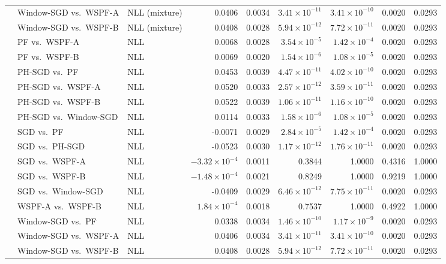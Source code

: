 {\begin{longtable}{@{}lllrrrrrr@{}}
 & Window-SGD vs.\ WSPF-A & NLL (mixture) & 0.0406 & 0.0034 & $3.41\times 10^{-11}$ & $3.41\times 10^{-10}$ & 0.0020 & 0.0293 \\
 & Window-SGD vs.\ WSPF-B & NLL (mixture) & 0.0408 & 0.0028 & $5.94\times 10^{-12}$ & $7.72\times 10^{-11}$ & 0.0020 & 0.0293 \\
 & PF vs.\ WSPF-A & NLL & 0.0068 & 0.0028 & $3.54\times 10^{-5}$ & $1.42\times 10^{-4}$ & 0.0020 & 0.0293 \\
 & PF vs.\ WSPF-B & NLL & 0.0069 & 0.0020 & $1.54\times 10^{-6}$ & $1.08\times 10^{-5}$ & 0.0020 & 0.0293 \\
 & PH-SGD vs.\ PF & NLL & 0.0453 & 0.0039 & $4.47\times 10^{-11}$ & $4.02\times 10^{-10}$ & 0.0020 & 0.0293 \\
 & PH-SGD vs.\ WSPF-A & NLL & 0.0520 & 0.0033 & $2.57\times 10^{-12}$ & $3.59\times 10^{-11}$ & 0.0020 & 0.0293 \\
 & PH-SGD vs.\ WSPF-B & NLL & 0.0522 & 0.0039 & $1.06\times 10^{-11}$ & $1.16\times 10^{-10}$ & 0.0020 & 0.0293 \\
 & PH-SGD vs.\ Window-SGD & NLL & 0.0114 & 0.0033 & $1.58\times 10^{-6}$ & $1.08\times 10^{-5}$ & 0.0020 & 0.0293 \\
 & SGD vs.\ PF & NLL & -0.0071 & 0.0029 & $2.84\times 10^{-5}$ & $1.42\times 10^{-4}$ & 0.0020 & 0.0293 \\
 & SGD vs.\ PH-SGD & NLL & -0.0523 & 0.0030 & $1.17\times 10^{-12}$ & $1.76\times 10^{-11}$ & 0.0020 & 0.0293 \\
 & SGD vs.\ WSPF-A & NLL & $-3.32\times 10^{-4}$ & 0.0011 & 0.3844 & 1.0000 & 0.4316 & 1.0000 \\
 & SGD vs.\ WSPF-B & NLL & $-1.48\times 10^{-4}$ & 0.0021 & 0.8249 & 1.0000 & 0.9219 & 1.0000 \\
 & SGD vs.\ Window-SGD & NLL & -0.0409 & 0.0029 & $6.46\times 10^{-12}$ & $7.75\times 10^{-11}$ & 0.0020 & 0.0293 \\
 & WSPF-A vs.\ WSPF-B & NLL & $1.84\times 10^{-4}$ & 0.0018 & 0.7537 & 1.0000 & 0.4922 & 1.0000 \\
 & Window-SGD vs.\ PF & NLL & 0.0338 & 0.0034 & $1.46\times 10^{-10}$ & $1.17\times 10^{-9}$ & 0.0020 & 0.0293 \\
 & Window-SGD vs.\ WSPF-A & NLL & 0.0406 & 0.0034 & $3.41\times 10^{-11}$ & $3.41\times 10^{-10}$ & 0.0020 & 0.0293 \\
 & Window-SGD vs.\ WSPF-B & NLL & 0.0408 & 0.0028 & $5.94\times 10^{-12}$ & $7.72\times 10^{-11}$ & 0.0020 & 0.0293 \\
\end{longtable}
}
